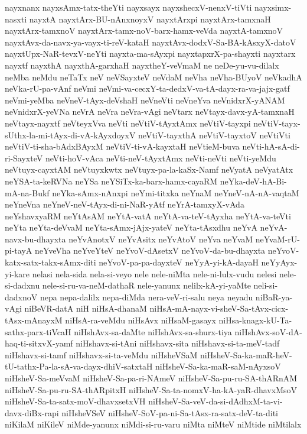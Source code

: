 {nayxnanx
nayxsAmx-tatx-theYti
nayxsayx
nayxshecxV-nenxV-tiVti
nayxsimx-nasxti
nayxtA
nayxtArx-BU-nAnxnoyxV
nayxtArxpi
nayxtArx-tamxnaH
nayxtArx-tamxnoV
nayxtArx-tamx-noV-barx-hamx-veVda
nayxtA-tamxnoV
nayxtAvx-da-navx-ya-vayx-ti-reV-kataH
nayxtAvx-dodxV-Sa-BA-kAsxyX-datoV
nayxtUpx-NaR-tevxV-neYti
nayxta-ma-sAyxpi
nayxtapxrX-pa-shayxti
nayxtarx
nayxtf
nayxthA
nayxthA-garxhaH
nayxtheY-veVmaM
ne
neDe-yu-vu-dilalx
neMba
neMdu
neTaTx
neV
neVSayxteV
neVdaM
neVha
neVha-BUyoV
neVkadhA
neVka-rU-pa-vAnf
neVmi
neVmi-va-cecxY-ta-dedxV-va-tA-dayx-ra-va-jajx-gatf
neVmi-yeMba
neVneV-tAyx-deVshaH
neVneVti
neVneYva
neVnidxrX-yANAM
neVnidxrX-yeVNa
neVrA
neVra
neVra-vAgi
neVtarx
neVtayx-davx-yA-tamxnaH
neVtayx-nayxtf
neVteyxVva
neVti
neVtiV-tAyxtAmx
neVtiV-tayxpi
neVtiV-tayx-sUthx-la-mi-tAyx-di-vA-kAyxdoyxV
neVtiV-tayxthA
neVtiV-tayxtoV
neVtiVti
neVtiV-ti-sha-bAdxBAyxM
neVtiV-ti-vA-kayxtaH
neVtieM-buva
neVti-hA-sA-di-ri-SayxteV
neVti-hoV-vAca
neVti-neV-tAyxtAmx
neVti-neVti
neVti-yeMdu
neVtuyx-cayxtAM
neVtuyxkwtx
neVtuyx-pa-la-kaSx-Namf
neVyatA
neVyatAtx
neYSA-ta-keRVNa
neYSa
neYSiTx-ka-barx-hamx-cayaRM
neYka-deV-hA-Bi-mA-na-Bukf
neYka-sAmx-nAnxpi
neYmi-titxka
neYnaM
neYneV-nA-nA-vaqtaM
neYneVna
neYneV-neV-tAyx-di-ni-NaR-yAtf
neYrA-tamxyX-vAda
neYshavxyaRM
neYtAsAM
neYtA-vatA
neYtA-va-teV-tAyxha
neYtA-va-teVti
neYta
neYta-deVvaM
neYta-sAmx-jAjx-yateV
neYta-tAsxdhu
neYvA
neYvA-navx-bu-dhayxta
neYvAnotxV
neYvAsitx
neYvAtoV
neYva
neYvaM
neYvaM-rU-pi-tayA
neYveVha
neYveYteV
neYvoV-dAsetxV
neYvoV-da-bu-dhayxta
neYvoV-katx-satx-takx-sAmx-diti
neYvoV-pa-pa-dayxteV
neYyA-yi-kA-dayaH
neYyAyx-yi-kare
nelasi
nela-sida
nela-si-veyo
nele
nele-niMta
nele-ni-lulx-vudu
nelesi
nele-si-dadxnu
nele-si-ru-va-neM-dathaR
nele-yanunx
nelilx-kA-yi-yaMte
neli-si-dadxnoV
nepa
nepa-dalilx
nepa-diMda
nera-veV-ri-salu
neya
neyadu
niBaR-ya-vAgi
niBeVR-datA
niH
niHsA-dhanaM
niHsA-mA-nayx-vi-sheV-Sa-tAvx-cicx-tAsx-mAnayxM
niHsA-ra-veMdu
niHsAvx
niHsaM-gasayx
niHsa-knagx-kU-Ta-sathx-parx-tiVcaH
niHshAvx-sa-daMte
niHshAvx-sa-shurx-tiya
niHshAvx-soV-dA-haq-ti-sitxvX-yamf
niHshavx-si-tAni
niHshavx-sita
niHshavx-si-ta-meV-tadf
niHshavx-si-tamf
niHshavx-si-ta-veMdu
niHsheVSaM
niHsheV-Sa-ka-maR-heV-tU-tathx-Pa-la-sA-va-dayx-dhiV-satxtaH
niHsheV-Sa-ka-maR-saM-nAyxsoV
niHsheV-Sa-meVvaM
niHsheV-Sa-pa-ri-NAmeV
niHsheV-Sa-pu-ru-SA-thARnAM
niHsheV-Sa-pu-ru-SA-thARpitxH
niHsheV-Sa-ta-nomxV-ha-kA-yaR-dhavxMsoV
niHsheV-Sa-ta-satx-moV-dhavxsetxVH
niHsheV-Sa-veV-da-si-dAdhxM-ta-vi-davx-diBx-rapi
niHsheVSeV
niHsheV-SoV-pa-ni-Sa-tAsx-ra-satx-deV-ta-diti
niKilaM
niKileV
niMde-yanunx
niMdi-si-ru-varu
niMta
niMteV
niMtide
niMtilalx
}
